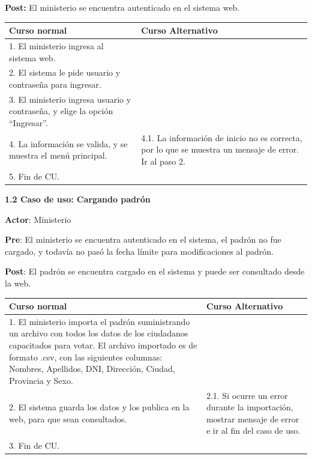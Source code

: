 \textbf{Post:} El ministerio se encuentra autenticado en el sistema web.
\begin{table}[h!]
	
 \begin{tabular}{|p{7.5cm} | p{7.5cm}|} 
 \hline
 \textbf{Curso normal} & \textbf{Curso Alternativo} \\
 \hline
 1. El ministerio ingresa al sistema web. & \\
 \hline
 
 2. El sistema le pide usuario y contraseña para ingresar. & \\
 \hline 
 3. El ministerio ingresa usuario y contraseña, y elige la opción “Ingresar”. & \\
 \hline 
 4. La información se valida, y se muestra el menú principal. & 
4.1. La información de inicio no es correcta, por lo que se muestra un mensaje de error. Ir al paso 2.
\\
 \hline 
 5. Fin de CU. & \\

 \hline
 \end{tabular}

\end{table}


\textbf{1.2 Caso de uso: Cargando padrón}

\textbf{Actor}: Ministerio

\textbf{Pre}: El ministerio se encuentra autenticado en el sistema, el padrón no fue cargado, y todavía no pasó la fecha límite para modificaciones al padrón.

\textbf{Post}: El padrón se encuentra cargado en el sistema y puede ser consultado desde la web.

\begin{table}[h!]
	
 \begin{tabular}{|p{7.5cm} | p{7.5cm}|} 
 \hline
 \textbf{Curso normal} & \textbf{Curso Alternativo} \\
 \hline
1. El ministerio importa el padrón suministrando un archivo con todos los datos de los ciudadanos capacitados para votar.
El archivo importado es de formato .csv, con las siguientes columnas: Nombres, Apellidos, DNI, Dirección, Ciudad, Provincia y Sexo. & \\
\hline

2. El sistema guarda los datos y los publica en la web, para que sean consultados. &
2.1. Si ocurre un error durante la importación, mostrar mensaje de error e ir al fin del caso de uso. \\
\hline
3. Fin de CU. & \\
\hline
 \end{tabular}

\end{table}


